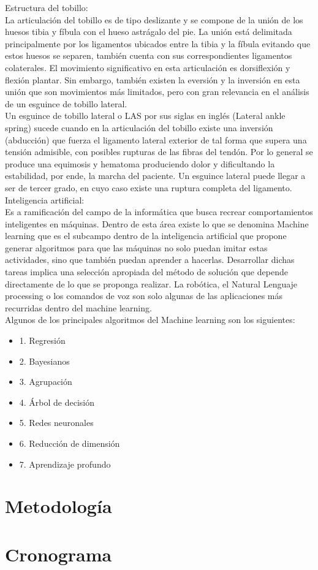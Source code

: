 Estructura del tobillo:\\
La articulación del tobillo es de tipo deslizante y se compone de la unión de los huesos tibia y fíbula con el hueso astrágalo del pie. La unión está delimitada principalmente por los ligamentos ubicados entre la tibia y la fíbula evitando que estos huesos se separen, también cuenta con sus correspondientes ligamentos colaterales. El movimiento significativo en esta articulación es dorsiflexión y flexión plantar. Sin embargo, también existen la eversión y la inversión en esta unión que son movimientos más limitados, pero con gran relevancia en el análisis de un esguince de tobillo lateral.\\
Un esguince de tobillo lateral o LAS por sus siglas en inglés (Lateral ankle spring) sucede cuando en la articulación del tobillo existe una inversión (abducción) que fuerza el ligamento lateral exterior de tal forma que supera una tensión admisible, con posibles rupturas de las fibras del tendón. Por lo general se produce una equimosis y hematoma produciendo dolor y dificultando la estabilidad, por ende, la marcha del paciente. Un esguince lateral puede llegar a ser de tercer grado, en cuyo caso existe una ruptura completa del ligamento.\\
Inteligencia artificial:\\
Es a ramificación del campo de la informática que busca recrear comportamientos inteligentes en máquinas. Dentro de esta área existe lo que se denomina Machine learning que es el subcampo dentro de la inteligencia artificial que propone generar algoritmos para que las máquinas no solo puedan imitar estas actividades, sino que también puedan aprender a hacerlas. Desarrollar dichas tareas implica una selección apropiada del método de solución que depende directamente de lo que se proponga realizar. La robótica, el Natural Lenguaje processing o los comandos de voz son solo algunas de las aplicaciones más recurridas dentro del machine learning.\\

Algunos de los principales algoritmos del Machine learning son los siguientes:\\
\begin{center}
\begin{itemize}
\item 1.	Regresión
\item 2.	Bayesianos
\item 3.	Agrupación
\item 4.	Árbol de decisión
\item 5.	Redes neuronales
\item 6.	Reducción de dimensión
\item 7.	Aprendizaje profundo
\end{itemize}
\end{center}
\section{Metodolog\'ia}


\section{Cronograma}
\printnomenclature